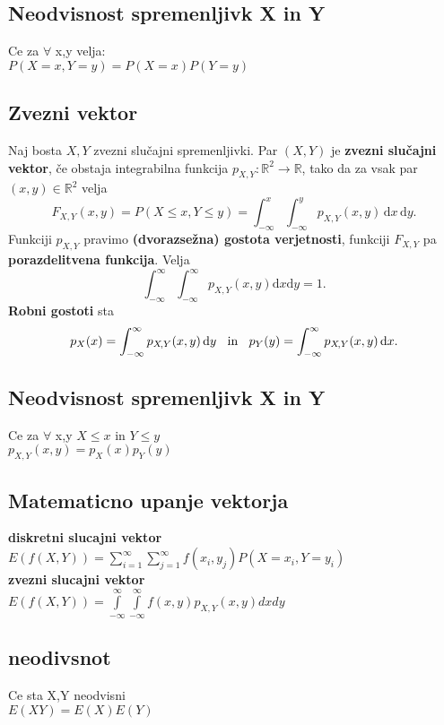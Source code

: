 \subsection{Neodvisnost spremenljivk X in Y}
Ce za $\forall$ x,y velja:\\
$P(X=x, Y=y)=P(X=x)P(Y=y)$


\subsection{Zvezni vektor}
\begin{center}
Naj bosta $X, Y$ zvezni slučajni spremenljivki. Par $(X,Y)$ je \textbf{zvezni slučajni vektor}, če obstaja integrabilna funkcija $p_{X\!,Y}:\mathbb{R}^2\to \mathbb{R}$, tako da za vsak par $(x,y)\in \mathbb{R}^2$ velja
    $$F_{X,Y}(x,y) = P(X\leq x, Y\leq y)= \int_{-\infty}^x \int_{-\infty}^y 
        p_{X\!,Y}(x,y)\, \mathrm{d}x\, \mathrm{d}y.$$
Funkciji $p_{X,Y}$ pravimo \textbf{(dvorazse\v zna) gostota verjetnosti},
funkciji $F_{X,Y}$ pa \textbf{porazdelitvena funkcija}.
Velja 
    $$\int_{-\infty}^{\infty}\int_{-\infty}^{\infty}p_{X,Y}(x,y)
        \text{d}x\text{d}y\!=\!1.$$
\textbf{Robni gostoti} sta
    $$p_X(x) = \int_{-\infty}^{\infty} p_{X\!,Y}(x,y)\, \mathrm{d}y \text{ \;\;in\;\; } 
    p_Y(y) = \int_{-\infty}^{\infty} p_{X\!,Y} (x,y)\, \mathrm{d}x.$$
\end{center}
    

\subsection{Neodvisnost spremenljivk X in Y}
Ce za $\forall$ x,y $X\leq x$ in $Y\leq y$\\
$p_{X,Y}(x,y)=p_X(x)p_Y(y)$


\subsection{Matematicno upanje vektorja}
\textbf{diskretni slucajni vektor}\\
$E(f(X,Y))=\sum\limits_{i=1}^\infty\sum\limits_{j=1}^\infty f(x_i,y_j)P(X=x_i, Y=y_i)$\\
\textbf{zvezni slucajni vektor}\\
$E(f(X,Y))=\int\limits_{-\infty}^{\infty}\int\limits_{-\infty}^{\infty}f(x,y)p_{X,Y}(x,y) dxdy$\\


\subsection{neodivsnot}
Ce sta X,Y neodvisni\\
$E(XY)=E(X)E(Y)$\\

